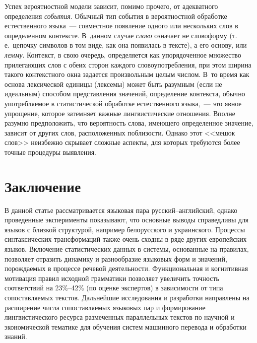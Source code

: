\begin{multicols}{2}
   Успех вероятностной модели зависит, помимо прочего, от адекватного
определения \textit{события}. Обычный тип события в вероятностной обработке
естественного языка~--- совместное появление одного или нескольких слов в
определенном контексте. В~данном случае \textit{слово} означает не словоформу
(т.\,е.\ цепочку символов в том виде, как она появилась в тексте), а его основу, или
\textit{лемму}. Контекст, в свою очередь, определяется как упорядоченное
множество прилегающих слов с обеих сторон каждого словоупотребления, при
этом ширина такого контекстного окна задается произвольным целым числом.
В~то время как основа лексической единицы (лексемы) может быть разумным
(если не идеальным) способом представления значений, определение контекста,
обычно упо\-треб\-ля\-емое в статистической обработке естественного языка,~--- это
явное упрощение, которое затемняет важные лингвистические отношения. Вполне
разумно предположить, что вероятность слова, имеющего определенное значение,
зависит от других слов, расположенных поблизости. Однако этот <<мешок слов>>
неизбежно скрывает сложные аспекты, для которых требуются более точные
процедуры выявления.

    \section{Заключение}

   В данной статье рассматривается языковая пара рус\-ский--английский, однако
проведенные эксперименты показывают, что основные выводы справедливы для
языков с близкой структурой, например белорусского и украинского. Процессы
синтакси\-ческих трансформаций также очень сходны в ряде других европейских
языков. Включение статистических данных в системы, основанные на правилах,
позволяет отразить динамику и разнообразие языковых форм и значений,
порождаемых в процессе речевой деятельности. Функциональная и когнитивная
мотивация правил исходной грамматики позволяет увеличить точность
соответствий на 23\%--42\% (по оценке экспертов) в за\-ви\-си\-мости от типа
сопоставляемых текстов. Дальнейшие исследования и разработки направлены на
расширение числа сопоставляемых языковых пар и формирование
лингвистического ресурса размеченных параллельных текстов по научной и
экономической тематике для обучения систем машинного перевода и обработки
знаний.


{\small\frenchspacing
{%
\begin{thebibliography}{99}


\end{thebibliography}}}
\end{multicols}
